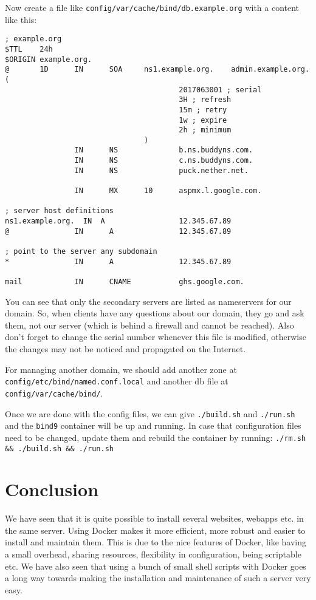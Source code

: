 \documentclass[a4paper]{article}
\begin{document}
Now create a file like \verb~config/var/cache/bind/db.example.org~
with a content like this:
\begin{verbatim}
; example.org
$TTL    24h
$ORIGIN example.org.
@       1D      IN      SOA     ns1.example.org.    admin.example.org. (
                                        2017063001 ; serial
                                        3H ; refresh
                                        15m ; retry
                                        1w ; expire
                                        2h ; minimum
                                )
                IN      NS              b.ns.buddyns.com.
                IN      NS              c.ns.buddyns.com.
                IN      NS              puck.nether.net.

                IN      MX      10      aspmx.l.google.com.

; server host definitions
ns1.example.org.  IN  A                 12.345.67.89
@               IN      A               12.345.67.89

; point to the server any subdomain
*               IN      A               12.345.67.89

mail            IN      CNAME           ghs.google.com.
\end{verbatim}

You can see that only the secondary servers are listed as nameservers
for our domain. So, when clients have any questions about our domain,
they go and ask them, not our server (which is behind a firewall and
cannot be reached). Also don’t forget to change the serial number whenever
this file is modified, otherwise the changes may not be noticed and
propagated on the Internet.

For managing another domain, we should add another zone at
\verb~config/etc/bind/named.conf.local~ and another db file at
\verb~config/var/cache/bind/~.

Once we are done with the config files, we can give \verb=./build.sh=
and \verb=./run.sh= and the \verb/bind9/ container will be up and
running. In case that configuration files need to be changed, update
them and rebuild the container by running:
\verb=./rm.sh && ./build.sh && ./run.sh=


\section{Conclusion}

We have seen that it is quite possible to install several websites,
webapps etc. in the same server. Using Docker makes it more efficient,
more robust and easier to install and maintain them. This is due to
the nice features of Docker, like having a small overhead, sharing
resources, flexibility in configuration, being scriptable etc. We have
also seen that using a bunch of small shell scripts with Docker goes a
long way towards making the installation and maintenance of such a
server very easy.
\end{document}
